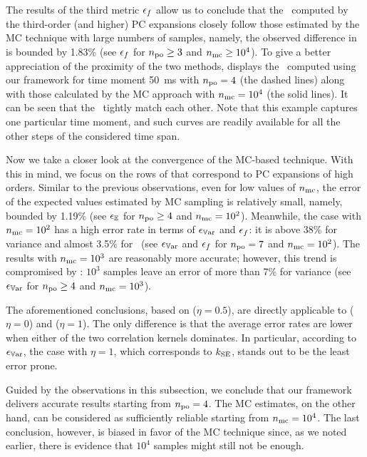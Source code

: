 The results of the third metric $\epsilon_f$ allow us to conclude that the \pdfs\ computed by the third-order (and higher) PC expansions closely follow those estimated by the MC technique with large numbers of samples, namely, the observed difference in  is bounded by 1.83\% (see $\epsilon_f$ for ${n_\text{po}} \geq 3$ and ${n_\text{mc}} \geq 10^4$).
To give a better appreciation of the proximity of the two methods,  displays the \pdfs\ computed using our framework for time moment 50~ms with ${n_\text{po}} = 4$ (the dashed lines) along with those calculated by the MC approach with ${n_\text{mc}} = 10^4$ (the solid lines).
It can be seen that the \pdfs\ tightly match each other.
Note that this example captures one particular time moment, and such curves are readily available for all the other steps of the considered time span.

Now we take a closer look at the convergence of the MC-based technique.
With this in mind, we focus on the rows of  that correspond to PC expansions of high orders.
Similar to the previous observations, even for low values of ${n_\text{mc}}$, the error of the expected values estimated by MC sampling is relatively small, namely, bounded by 1.19\% (see $\epsilon_\mathbb{E}$ for ${n_\text{po}} \geq 4$ and ${n_\text{mc}} = 10^2$).
Meanwhile, the case with ${n_\text{mc}} = 10^2$ has a high error rate in terms of $\epsilon_{\mathbb{V}\text{ar}}$ and $\epsilon_f$: it is above 38\% for variance and almost 3.5\% for \pdfs\ (see $\epsilon_{\mathbb{V}\text{ar}}$ and $\epsilon_f$ for ${n_\text{po}} = 7$ and ${n_\text{mc}} = 10^2$).
The results with ${n_\text{mc}} = 10^3$ are reasonably more accurate; however, this trend is compromised by : $10^3$ samples leave an error of more than 7\% for variance (see $\epsilon_{\mathbb{V}\text{ar}}$ for ${n_\text{po}} \geq 4$ and ${n_\text{mc}} = 10^3$).

The aforementioned conclusions, based on  ($\eta = 0.5$), are directly applicable to  ($\eta = 0$) and  ($\eta = 1$).
The only difference is that the average error rates are lower when either of the two correlation kernels dominates.
In particular, according to $\epsilon_{\mathbb{V}\text{ar}}$, the case with $\eta = 1$, which corresponds to $k_{\text{SE}}$, stands out to be the least error prone.

Guided by the observations in this subsection, we conclude that our framework delivers accurate results starting from ${n_\text{po}} = 4$.
The MC estimates, on the other hand, can be considered as sufficiently reliable starting from ${n_\text{mc}} = 10^4$.
The last conclusion, however, is biased in favor of the MC technique since, as we noted earlier, there is evidence that $10^4$ samples might still not be enough.
